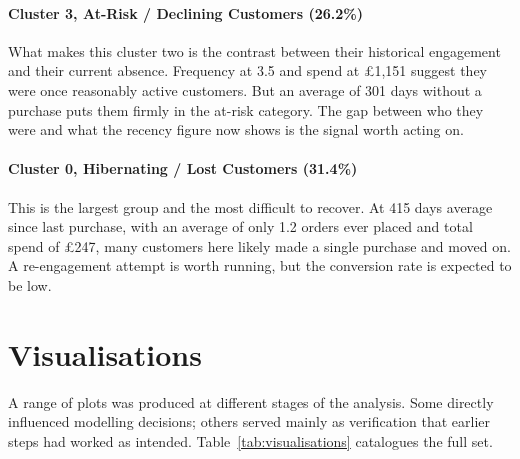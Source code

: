 \documentclass[12pt, a4paper]{article}
\begin{document}
\paragraph{Cluster 3, At-Risk / Declining Customers (26.2\%)}
What makes this cluster two is the contrast between their historical engagement and their current absence. Frequency at 3.5 and spend at \pounds1,151 suggest they were once reasonably active customers. But an average of 301 days without a purchase puts them firmly in the at-risk category. The gap between who they were and what the recency figure now shows is the signal worth acting on.

\paragraph{Cluster 0, Hibernating / Lost Customers (31.4\%)}
This is the largest group and the most difficult to recover. At 415 days average since last purchase, with an average of only 1.2 orders ever placed and total spend of \pounds247, many customers here likely made a single purchase and moved on. A re-engagement attempt is worth running, but the conversion rate is expected to be low.

\section{Visualisations}\label{sec:visualisations}

A range of plots was produced at different stages of the analysis. Some directly influenced modelling decisions; others served mainly as verification that earlier steps had worked as intended. Table~\ref{tab:visualisations} catalogues the full set.
\end{document}
